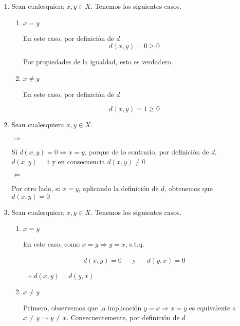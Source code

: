 \begin{proofexplanation}    
    \begin{enumerate}[label=(\subscript{D}{{\arabic*}})]
    \item Sean cualesquiera $x,y \in X$. Tenemos los siguientes casos.
    \begin{enumerate}
        \item $x=y$

        En este caso, por definición de $d$
        \begin{equation*}
            d(x,y) = 0 \geqslant 0
        \end{equation*}
        
        Por propiedades de la igualdad, esto es verdadero.
        \item $x \neq y$

        En este caso, por definición de $d$

        \begin{equation*}
            d(x,y) = 1 \geqslant 0
        \end{equation*}
    \end{enumerate}
    \item Sean cualesquiera $x,y \in X$.

    $\Rightarrow$

    Si $d(x,y)=0 \Rightarrow x=y$, porque de lo contrario, por definición de $d$, $d(x,y)=1$ y en consecuencia $d(x,y)\neq0$

    $\Leftarrow$

    Por otro lado, si $x=y$, aplicando la definición de $d$, obtenemos que $d(x,y) = 0$

    \item Sean cualesquiera $x,y \in X$. Tenemos los siguientes casos.

    \begin{enumerate}
        \item $x=y$

        En este caso, como $x=y \Rightarrow y=x$, s.t.q.

        \begin{align*}
        d(x,y)=0 & & \text{y} & & d(y,x) =0
        \end{align*}

        $\Rightarrow d(x,y) = d(y,x)$

        \item $x\neq y$

        Primero, observemos que la implicación $y=x \Rightarrow x=y$ es equivalente a $x\neq y \Rightarrow y \neq x$. Consecuentemente, por definición de $d$


\end{enumerate}
\end{enumerate}
\end{proofexplanation}
